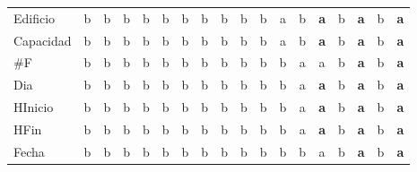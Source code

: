 {\begin{longtable}{lccccccccccccccccc}
Edificio & \color{grisclaro}b & \color{grisclaro}b & \color{grisclaro}b & \color{grisclaro}b & \color{grisclaro}b & \color{grisclaro}b & \color{grisclaro}b & \color{grisclaro}b & \color{grisclaro}b & \color{grisclaro}b & a & \color{grisclaro}b & \textbf{\color{azuldos}a} & \color{grisclaro}b & \textbf{\color{azuldos}a} & \color{grisclaro}b & \textbf{\color{azuldos}a} \\
Capacidad & \color{grisclaro}b & \color{grisclaro}b & \color{grisclaro}b & \color{grisclaro}b & \color{grisclaro}b & \color{grisclaro}b & \color{grisclaro}b & \color{grisclaro}b & \color{grisclaro}b & \color{grisclaro}b & a & \color{grisclaro}b & \textbf{\color{azuldos}a} & \color{grisclaro}b & \textbf{\color{azuldos}a} & \color{grisclaro}b & \textbf{\color{azuldos}a} \\
\#F & \color{grisclaro}b & \color{grisclaro}b & \color{grisclaro}b & \color{grisclaro}b & \color{grisclaro}b & \color{grisclaro}b & \color{grisclaro}b & \color{grisclaro}b & \color{grisclaro}b & \color{grisclaro}b & \color{grisclaro}b & a & a & \color{grisclaro}b & \textbf{\color{azuldos}a} & \color{grisclaro}b & \textbf{\color{azuldos}a} \\
Dia & \color{grisclaro}b & \color{grisclaro}b & \color{grisclaro}b & \color{grisclaro}b & \color{grisclaro}b & \color{grisclaro}b & \color{grisclaro}b & \color{grisclaro}b & \color{grisclaro}b & \color{grisclaro}b & \color{grisclaro}b & a & \textbf{\color{azuldos}a} & \color{grisclaro}b & \textbf{\color{azuldos}a} & \color{grisclaro}b & \textbf{\color{azuldos}a} \\
HInicio & \color{grisclaro}b & \color{grisclaro}b & \color{grisclaro}b & \color{grisclaro}b & \color{grisclaro}b & \color{grisclaro}b & \color{grisclaro}b & \color{grisclaro}b & \color{grisclaro}b & \color{grisclaro}b & \color{grisclaro}b & a & \textbf{\color{azuldos}a} & \color{grisclaro}b & \textbf{\color{azuldos}a} & \color{grisclaro}b & \textbf{\color{azuldos}a} \\
HFin & \color{grisclaro}b & \color{grisclaro}b & \color{grisclaro}b & \color{grisclaro}b & \color{grisclaro}b & \color{grisclaro}b & \color{grisclaro}b & \color{grisclaro}b & \color{grisclaro}b & \color{grisclaro}b & \color{grisclaro}b & a & \textbf{\color{azuldos}a} & \color{grisclaro}b & \textbf{\color{azuldos}a} & \color{grisclaro}b & \textbf{\color{azuldos}a} \\
Fecha & \color{grisclaro}b & \color{grisclaro}b & \color{grisclaro}b & \color{grisclaro}b & \color{grisclaro}b & \color{grisclaro}b & \color{grisclaro}b & \color{grisclaro}b & \color{grisclaro}b & \color{grisclaro}b & \color{grisclaro}b & \color{grisclaro}b & a & \color{grisclaro}b & \textbf{\color{azuldos}a} & \color{grisclaro}b & \textbf{\color{azuldos}a} \\

\end{longtable}}
